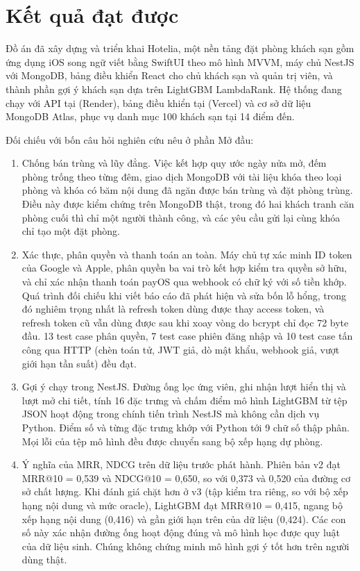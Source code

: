 
\section*{Kết quả đạt được}

Đồ án đã xây dựng và triển khai Hotelia, một nền tảng đặt phòng khách sạn gồm ứng dụng iOS song ngữ viết bằng SwiftUI theo mô hình MVVM, máy chủ NestJS với MongoDB, bảng điều khiển React cho chủ khách sạn và quản trị viên, và thành phần gợi ý khách sạn dựa trên LightGBM LambdaRank. Hệ thống đang chạy với API tại  (Render), bảng điều khiển tại  (Vercel) và cơ sở dữ liệu MongoDB Atlas, phục vụ danh mục 100 khách sạn tại 14 điểm đến.

Đối chiếu với bốn câu hỏi nghiên cứu nêu ở phần Mở đầu:

\begin{enumerate}[label=Q\arabic*., leftmargin=1.4cm]
\item Chống bán trùng và lũy đẳng. Việc kết hợp quy ước ngày nửa mở, đếm phòng trống theo từng đêm, giao dịch MongoDB với tài liệu khóa theo loại phòng và khóa  có băm nội dung đã ngăn được bán trùng và đặt phòng trùng. Điều này được kiểm chứng trên MongoDB thật, trong đó hai khách tranh căn phòng cuối thì chỉ một người thành công, và các yêu cầu gửi lại cùng khóa chỉ tạo một đặt phòng.
\item Xác thực, phân quyền và thanh toán an toàn. Máy chủ tự xác minh ID token của Google và Apple, phân quyền ba vai trò kết hợp kiểm tra quyền sở hữu, và chỉ xác nhận thanh toán payOS qua webhook có chữ ký với số tiền khớp. Quá trình đối chiếu khi viết báo cáo đã phát hiện và sửa bốn lỗ hổng, trong đó nghiêm trọng nhất là refresh token dùng được thay access token, và refresh token cũ vẫn dùng được sau khi xoay vòng do bcrypt chỉ đọc 72 byte đầu. 13 test case phân quyền, 7 test case phiên đăng nhập và 10 test case tấn công qua HTTP (chèn toán tử, JWT giả, dò mật khẩu, webhook giả, vượt giới hạn tần suất) đều đạt.
\item Gợi ý chạy trong NestJS. Đường ống lọc ứng viên, ghi nhận lượt hiển thị và lượt mở chi tiết, tính 16 đặc trưng và chấm điểm mô hình LightGBM từ tệp JSON hoạt động trong chính tiến trình NestJS mà không cần dịch vụ Python. Điểm số và từng đặc trưng khớp với Python tới 9 chữ số thập phân. Mọi lỗi của tệp mô hình đều được chuyển sang bộ xếp hạng dự phòng.
\item Ý nghĩa của MRR, NDCG trên dữ liệu trước phát hành. Phiên bản v2 đạt MRR@10 = 0,539 và NDCG@10 = 0,650, so với 0,373 và 0,520 của đường cơ sở chất lượng. Khi đánh giá chặt hơn ở v3 (tập kiểm tra riêng, so với bộ xếp hạng nội dung và mức oracle), LightGBM đạt MRR@10 = 0,415, ngang bộ xếp hạng nội dung (0,416) và gần giới hạn trên của dữ liệu (0,424). Các con số này xác nhận đường ống hoạt động đúng và mô hình học được quy luật của dữ liệu sinh. Chúng không chứng minh mô hình gợi ý tốt hơn trên người dùng thật.
\end{enumerate}

